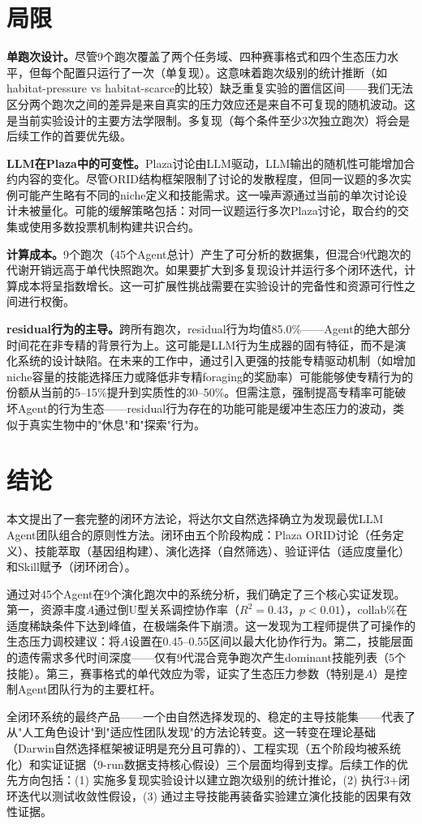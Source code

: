 \documentclass[conference]{IEEEtran}
\begin{document}
\section{局限}

\textbf{单跑次设计。}尽管9个跑次覆盖了两个任务域、四种赛事格式和四个生态压力水平，但每个配置只运行了一次（单复现）。这意味着跑次级别的统计推断（如habitat-pressure vs habitat-scarce的比较）缺乏重复实验的置信区间——我们无法区分两个跑次之间的差异是来自真实的压力效应还是来自不可复现的随机波动。这是当前实验设计的主要方法学限制。多复现（每个条件至少3次独立跑次）将会是后续工作的首要优先级。

\textbf{LLM在Plaza中的可变性。}Plaza讨论由LLM驱动，LLM输出的随机性可能增加合约内容的变化。尽管ORID结构框架限制了讨论的发散程度，但同一议题的多次实例可能产生略有不同的niche定义和技能需求。这一噪声源通过当前的单次讨论设计未被量化。可能的缓解策略包括：对同一议题运行多次Plaza讨论，取合约的交集或使用多数投票机制构建共识合约。

\textbf{计算成本。}9个跑次（45个Agent总计）产生了可分析的数据集，但混合9代跑次的代谢开销远高于单代快照跑次。如果要扩大到多复现设计并运行多个闭环迭代，计算成本将呈指数增长。这一可扩展性挑战需要在实验设计的完备性和资源可行性之间进行权衡。

\textbf{residual行为的主导。}跨所有跑次，residual行为均值85.0\%——Agent的绝大部分时间花在非专精的背景行为上。这可能是LLM行为生成器的固有特征，而不是演化系统的设计缺陷。在未来的工作中，通过引入更强的技能专精驱动机制（如增加niche容量的技能选择压力或降低非专精foraging的奖励率）可能能够使专精行为的份额从当前的5--15\%提升到实质性的30--50\%。但需注意，强制提高专精率可能破坏Agent的行为生态——residual行为存在的功能可能是缓冲生态压力的波动，类似于真实生物中的"休息"和"探索"行为。

\section{结论}

本文提出了一套完整的闭环方法论，将达尔文自然选择确立为发现最优LLM Agent团队组合的原则性方法。闭环由五个阶段构成：Plaza ORID讨论（任务定义）、技能萃取（基因组构建）、演化选择（自然筛选）、验证评估（适应度量化）和Skill赋予（闭环闭合）。

通过对45个Agent在9个演化跑次中的系统分析，我们确定了三个核心实证发现。第一，资源丰度$A$通过倒U型关系调控协作率（$R^2=0.43$，$p<0.01$），collab\%在适度稀缺条件下达到峰值，在极端条件下崩溃。这一发现为工程师提供了可操作的生态压力调校建议：将$A$设置在0.45--0.55区间以最大化协作行为。第二，技能层面的遗传需求多代时间深度——仅有9代混合竞争跑次产生dominant技能列表（5个技能）。第三，赛事格式的单代效应为零，证实了生态压力参数（特别是$A$）是控制Agent团队行为的主要杠杆。

全闭环系统的最终产品——一个由自然选择发现的、稳定的主导技能集——代表了从"人工角色设计"到"适应性团队发现"的方法论转变。这一转变在理论基础（Darwin自然选择框架被证明是充分且可靠的）、工程实现（五个阶段均被系统化）和实证证据（9-run数据支持核心假设）三个层面均得到支撑。后续工作的优先方向包括：(1) 实施多复现实验设计以建立跑次级别的统计推论，(2) 执行3+闭环迭代以测试收敛性假设，(3) 通过主导技能再装备实验建立演化技能的因果有效性证据。



\end{document}
